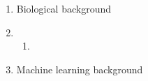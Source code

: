 {
    \color{red}
    \begin{enumerate}
        \item Biological background
        \item \begin{enumerate}
            \item 
        \end{enumerate}
        \item Machine learning background
    \end{enumerate}
}